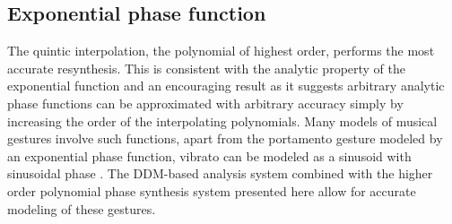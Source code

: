 \subsection{Exponential phase function}

The quintic interpolation, the polynomial of highest order, performs the most
accurate resynthesis. This is consistent with the analytic property of the
exponential function and an encouraging result as it suggests arbitrary analytic
phase functions can be approximated with arbitrary accuracy simply by increasing
the order of the interpolating polynomials. Many models of musical gestures
involve such functions, apart from the portamento gesture modeled by an
exponential phase function, vibrato can be modeled as a sinusoid with sinusoidal
phase \cite{maher1990investigation}. The DDM-based analysis system combined with
the higher order polynomial phase synthesis system presented here allow for
accurate modeling of these gestures.
